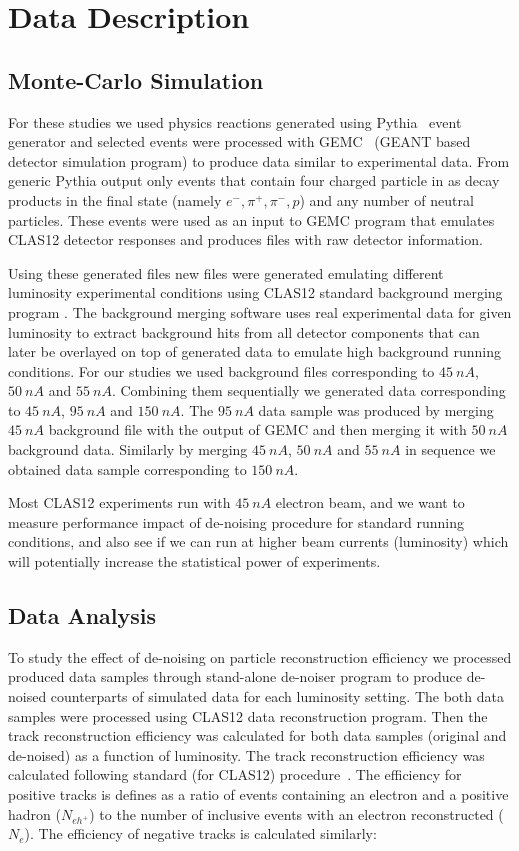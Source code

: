 \section{Data Description}

\subsection{Monte-Carlo Simulation}

For these studies we used physics reactions generated using Pythia~\cite{Pythia:2022} event generator and selected events were processed with GEMC~\cite{gemc:2022} (GEANT based detector simulation program) to produce data similar to experimental data. From generic Pythia output only events that contain four charged particle in as decay products in the final state (namely $e^-,\pi^+,\pi^-,p$) and any number of neutral particles. These events were used as an input to GEMC program that emulates CLAS12 detector responses and produces files with raw detector information.

Using these generated files new files were generated emulating different luminosity experimental conditions using CLAS12 standard background merging program \cite{Stepanyan:2020bg}. The background merging software uses real experimental data for given luminosity to extract background hits from all detector components that can later be overlayed on top of generated data to emulate high background running conditions. For our studies we used background files corresponding to $45~nA$, $50~nA$ and $55~nA$. Combining them sequentially we generated data corresponding to $45~nA$, $95~nA$ and $150~nA$. The $95~nA$ data sample was produced by merging $45~nA$ background file with the output of GEMC and then merging it with $50~nA$ background data. Similarly by merging $45~nA$, $50~nA$ and $55~nA$ in sequence we obtained data sample corresponding to $150~nA$. 

Most CLAS12 experiments run with $45~nA$ electron beam, and we want to measure performance impact of de-noising procedure for standard running conditions, and also see if we can run at higher beam currents (luminosity) which will potentially increase the statistical power of experiments.

\subsection{Data Analysis}

To study the effect of de-noising on particle reconstruction efficiency we processed produced data samples through stand-alone de-noiser program to produce de-noised counterparts of simulated data for each luminosity setting. The both data samples were processed using CLAS12 data reconstruction program. Then the track reconstruction efficiency was calculated for both data samples (original and de-noised) as a function of luminosity. The track reconstruction efficiency was calculated following standard (for CLAS12) procedure~\cite{Stepanyan:2020bg}. The efficiency for positive  tracks is defines as a ratio of 
events containing an electron and a positive  hadron ($N_{eh^+}$) to the number of inclusive events with an electron reconstructed ($N_{e}$). The efficiency of negative tracks is calculated similarly:


